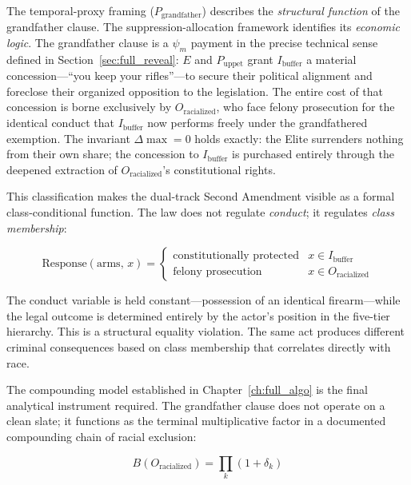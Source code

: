 The temporal-proxy framing ($P_{\text{grandfather}}$) describes the \textit{structural function} of the grandfather clause. The suppression-allocation framework identifies its \textit{economic logic}. The grandfather clause is a $\psi_m$ payment in the precise technical sense defined in Section~\ref{sec:full_reveal}: $E$ and $P_{\text{uppet}}$ grant $I_{\text{buffer}}$ a material concession---``you keep your rifles''---to secure their political alignment and foreclose their organized opposition to the legislation. The entire cost of that concession is borne exclusively by $O_{\text{racialized}}$, who face felony prosecution for the identical conduct that $I_{\text{buffer}}$ now performs freely under the grandfathered exemption. The invariant $\Delta\max = 0$ holds exactly: the Elite surrenders nothing from their own share; the concession to $I_{\text{buffer}}$ is purchased entirely through the deepened extraction of $O_{\text{racialized}}$'s constitutional rights.

This classification makes the dual-track Second Amendment visible as a formal class-conditional function. The law does not regulate \textit{conduct}; it regulates \textit{class membership}:

\begin{equation}\label{eq:12.11-dualtrack-2a}
\text{Response}(\text{arms},\, x) =
\begin{cases}
\text{constitutionally protected} & x \in I_{\text{buffer}} \\
\text{felony prosecution} & x \in O_{\text{racialized}}
\end{cases}
\end{equation}

The conduct variable is held constant---possession of an identical firearm---while the legal outcome is determined entirely by the actor's position in the five-tier hierarchy. This is a structural equality violation. The same act produces different criminal consequences based on class membership that correlates directly with race.

The compounding model established in Chapter~\ref{ch:full_algo} is the final analytical instrument required. The grandfather clause does not operate on a clean slate; it functions as the terminal multiplicative factor in a documented compounding chain of racial exclusion:

\begin{equation}\label{eq:12.12-grandfather-compound}
B(O_{\text{racialized}}) = \prod_{k} (1 + \delta_k)
\end{equation}

